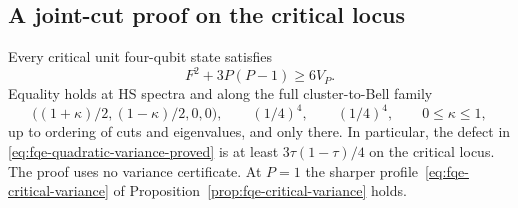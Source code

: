 \subsection{A joint-cut proof on the critical locus}
\label{sec:fqe-critical-quadratic-variance}

\begin{proposition}
\label{prop:fqe-critical-quadratic-variance}
Every critical unit four-qubit state satisfies
\[
 F^2+3P(P-1)\ge6V_P.
 \tag{CQ}\label{eq:fqe-critical-quadratic-variance}
\]
Equality holds at HS spectra and along the full cluster-to-Bell family
\[
 \bigl((1+\kappa)/2,(1-\kappa)/2,0,0\bigr),\qquad
 (1/4)^4,\qquad(1/4)^4,\qquad 0\le\kappa\le1,
\]
up to ordering of cuts and eigenvalues, and only there.
In particular, the defect in \eqref{eq:fqe-quadratic-variance-proved} is at least
$3\tau(1-\tau)/4$ on the critical locus. The proof uses no variance certificate. At $P=1$ the sharper
profile~\eqref{eq:fqe-critical-variance} of Proposition~\ref{prop:fqe-critical-variance} holds.
\end{proposition}
